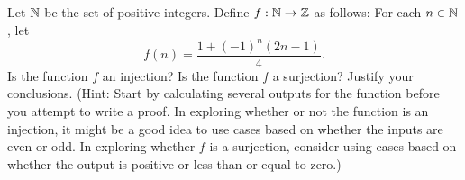 \begin{comment}
\item Let $x = (x_1,x_2)$ be in $X$ and $y = (y_1,y_2)$ be in $Y$. The result of part (b) shows that 
\[\left[\left(h_1 \times h_2\right) \circ \left(f_1 \times f_2\right)\right](x) = (h_1(f_1(x_1)), h_2(f_2(x_2))) = (x_1,x_2) = x\]
and
\[\left[\left(f_1 \times f_2\right) \circ \left(h_1 \times h_2\right)]\right](y) = (f_1(h_1(y_1)), f_2(h_2(y_2))) = (y_1,y_2) = y,\]
So $\left(h_1 \times h_2\right) \circ \left(f_1 \times f_2\right)$ is the identity on $X$ and $\left(f_1 \times f_2\right) \circ \left(h_1 \times h_2\right)$ is the identity on $Y$. This verifies that $\left(f_1 \times f_2\right)^{-1} = h_1 \times h_2$. 

\ea

\end{comment}



\item Let $\mathbb{N}$ be the set of positive integers. Define $f:\mathbb{N} \to \mathbb{Z}$ as follows: For each $n \in \mathbb{N}$, let
\[f(n) = \frac{1 + (-1)^n (2n - 1)}{4}.\]
Is the function $f$ an injection?  Is the function $f$ a surjection?  Justify your conclusions. (Hint: Start by calculating several outputs for the function before you attempt to write a proof.  In exploring whether or not the function is an injection, it might be a good idea to use cases based on whether the inputs are even or odd.  In exploring whether $f$ is a surjection, consider using cases based on whether the output is positive or less than or equal to zero.)

